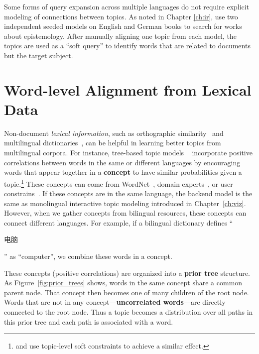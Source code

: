 Some forms of query expansion across multiple languages do not require explicit modeling of connections between topics.
As noted in Chapter \ref{ch:ir}, \citet{erlin2017topic} use two independent seeded models on English and German books to search for works about epistemology.
After manually aligning one topic from each model, the topics are used as a ``soft query'' to identify words that are related to documents but the target subject.

\section{Word-level Alignment from Lexical Data}

Non-document \emph{lexical information}, such as orthographic
similarity~\citep{boyd-graber-09} and multilingual
dictionaries~\citep{Zhang-10,boyd-graber-10}, can be helpful in learning
better topics from multilingual corpora. For instance, tree-based
topic models ~\citep{boyd-graber-07,andrzejewski-09,hu-14:itm}
incorporate positive correlations between words in the same or
different languages by encouraging words that appear together in a
{\bf concept} to have similar probabilities given a
topic.\footnote{\citet{boyd-graber-09} and \citet{Zhang-10} use
  topic-level soft constraints to achieve a similar effect.} These
concepts can come from WordNet~\citep{boyd-graber-10}, domain
experts~\citep{andrzejewski-09}, or user
constrains~\citep{hu-14:itm}. If these concepts are in the same
language, the backend model is the same as monolingual interactive topic modeling
introduced in Chapter~\ref{ch:viz}. However, when we gather concepts
from bilingual resources, these concepts can connect different
languages. For example, if a bilingual dictionary defines
``\begin{CJK*}{UTF8}{gbsn}电脑\end{CJK*}'' as ``computer'', we combine
  these words in a concept.

These concepts (positive correlations) are organized into a {\bf prior
  tree} structure. As Figure~\ref{fig:prior_trees} shows, words in the
same concept share a common parent node. That concept then becomes
one of many children of the root node.  Words that are not in any
concept---{\bf uncorrelated words}---are directly connected to the
root node. Thus a topic becomes a distribution over all paths in this
prior tree and each path is associated with a word.

